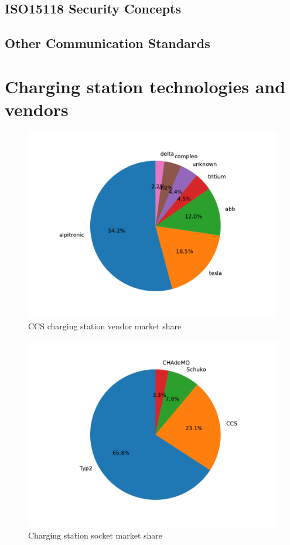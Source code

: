 \documentclass[conference,flushend]{iaria} %
\begin{document}
\subsection{ISO15118 Security Concepts}

\subsection{Other Communication Standards}

\section{Charging station technologies and vendors}
\begin{figure}[ht]
    \centering
    \includegraphics[width=.489\textwidth]{graphs/market_analysis.pdf}
    \caption{CCS charging station vendor market share}
    \label{fig:marketshare}
\end{figure}

\begin{figure}[ht]
    \centering
    \includegraphics[width=.489\textwidth]{graphs/socket_analysis.pdf}
    \caption{Charging station socket market share}
    \label{fig:sockets}
\end{figure}
\end{document}
